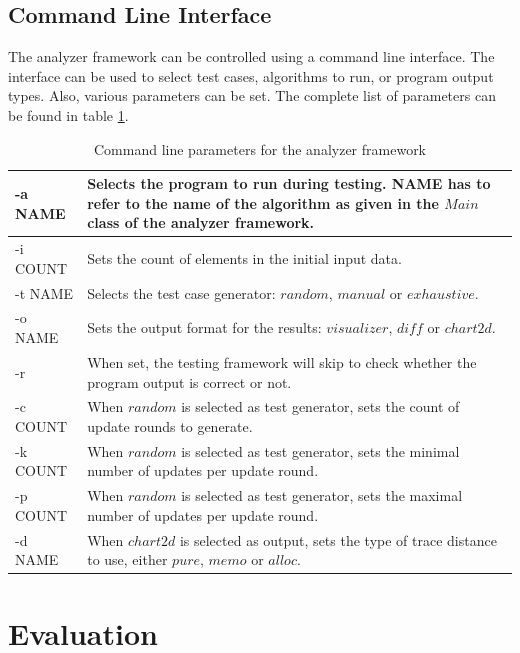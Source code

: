 \section{Command Line Interface}

The analyzer framework can be controlled using a command line interface. The interface can be used to select test cases, algorithms to run, or program output types. Also, various parameters can be set. The complete list of parameters can be found in table \ref{tbl:commands}.

\begin{table}[h]
\centering
\begin{tabular}{|l|p{10cm}|}
\hline
-a NAME  & Selects the program to run during testing. NAME has to refer to the name of the algorithm as given in the $Main$ class of the analyzer framework. \\ \hline
-i COUNT & Sets the count of elements in the initial input data.\\ \hline
-t NAME  & Selects the test case generator: $random$, $manual$ or $exhaustive$.\\ \hline
-o NAME  & Sets the output format for the results: $visualizer$, $diff$ or $chart2d$.\\ \hline
-r & When set, the testing framework will skip to check whether the program output is correct or not. \\ \hline
-c COUNT & When $random$ is selected as test generator, sets the count of update rounds to generate. \\ \hline
-k COUNT & When $random$ is selected as test generator, sets the minimal number of updates per update round. \\ \hline
-p COUNT & When $random$ is selected as test generator, sets the maximal number of updates per update round. \\ \hline
-d NAME & When $chart2d$ is selected as output, sets the type of trace distance to use, either $pure$, $memo$ or $alloc$. \\ \hline
\end{tabular}
\caption{Command line parameters for the analyzer framework}
\label{tbl:commands}
\end{table}

\chapter{Evaluation}
\label{ch:eval}

